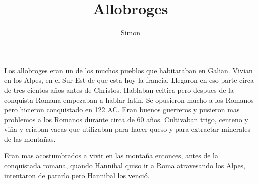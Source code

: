\documentclass[a4paper]{article}
\author{Simon}
\title{Allobroges}
\begin{document}
\maketitle
Los allobroges eran un de los muchos pueblos que habitaraban en Galian. Vivian en los Alpes, en el Sur Est de que esta hoy la francia. Llegaron en eso parte circa de tres cientos años antes de Christos. Hablaban celtica pero despues de la conquista Romana empezaban a hablar latin.  Se opusieron mucho a los Romanos pero hicieron conquistado en 122 AC. Eran buenos guerreros y pusieron mas problemos a los Romanos durante circa de 60 años. Cultivaban trigo, centeno y viña y criaban vacas que utilizaban para hacer queso y para extractar minerales de las montañas.

Eran mas acostumbrados a vivir en las montaña entonces, antes de la conquistada romana, quando Hannibal quiso ir a Roma atravesando los Alpes, intentaron de pararlo pero Hannibal los venció.
\end{document}
